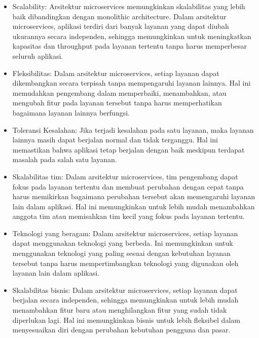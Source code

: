 \documentclass{report}
\begin{document}
	\begin{itemize}
		\item Scalability: Arsitektur microservices memungkinkan skalabilitas yang lebih baik dibandingkan dengan monolithic architecture. Dalam arsitektur microservices, aplikasi terdiri dari banyak layanan yang dapat diubah ukurannya secara independen, sehingga memungkinkan untuk meningkatkan kapasitas dan throughput pada layanan tertentu tanpa harus memperbesar seluruh aplikasi.
		\item Fleksibilitas: Dalam arsitektur microservices, setiap layanan dapat dikembangkan secara terpisah tanpa mempengaruhi layanan lainnya. Hal ini memudahkan pengembang dalam memperbaiki, menambahkan, atau mengubah fitur pada layanan tersebut tanpa harus memperhatikan bagaimana layanan lainnya berfungsi.
		\item Toleransi Kesalahan: Jika terjadi kesalahan pada satu layanan, maka layanan lainnya masih dapat berjalan normal dan tidak terganggu. Hal ini memastikan bahwa aplikasi tetap berjalan dengan baik meskipun terdapat masalah pada salah satu layanan.
		\item Skalabilitas tim: Dalam arsitektur microservices, tim pengembang dapat fokus pada layanan tertentu dan membuat perubahan dengan cepat tanpa harus memikirkan bagaimana perubahan tersebut akan memengaruhi layanan lain dalam aplikasi. Hal ini memungkinkan untuk lebih mudah menambahkan anggota tim atau memisahkan tim kecil yang fokus pada layanan tertentu.
		\item Teknologi yang beragam: Dalam arsitektur microservices, setiap layanan dapat menggunakan teknologi yang berbeda. Ini memungkinkan untuk menggunakan teknologi yang paling sesuai dengan kebutuhan layanan tersebut tanpa harus mempertimbangkan teknologi yang digunakan oleh layanan lain dalam aplikasi.
		\item Skalabilitas bisnis: Dalam arsitektur microservices, setiap layanan dapat berjalan secara independen, sehingga memungkinkan untuk lebih mudah menambahkan fitur baru atau menghilangkan fitur yang sudah tidak diperlukan lagi. Hal ini memungkinkan bisnis untuk lebih fleksibel dalam menyesuaikan diri dengan perubahan kebutuhan pengguna dan pasar.
	\end{itemize}
	
	
\end{document}
